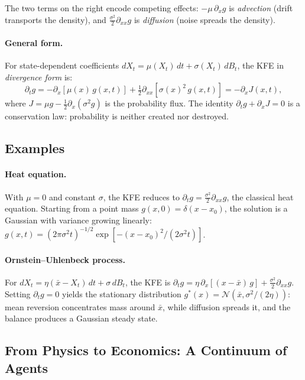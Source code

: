 \documentclass[11pt,a4paper]{report}
\begin{document}
The two terms on the right encode competing effects: $-\mu\,\partial_x g$ is \emph{advection} (drift transports the density), and $\tfrac{\sigma^2}{2}\partial_{xx}g$ is \emph{diffusion} (noise spreads the density).

\paragraph{General form.}  For state-dependent coefficients $dX_t = \mu(X_t)\,dt + \sigma(X_t)\,dB_t$, the KFE in \emph{divergence form} is:
\begin{equation}
\partial_t g = -\partial_x\!\left[\mu(x)\,g(x,t)\right] + \tfrac{1}{2}\partial_{xx}\!\left[\sigma(x)^2\,g(x,t)\right] = -\partial_x J(x,t),
\label{eq:kfe_general}
\end{equation}
where $J = \mu g - \tfrac{1}{2}\partial_x(\sigma^2 g)$ is the probability flux.  The identity $\partial_t g + \partial_x J = 0$ is a conservation law: probability is neither created nor destroyed.

\subsection{Examples}

\paragraph{Heat equation.}  With $\mu = 0$ and constant $\sigma$, the KFE reduces to $\partial_t g = \tfrac{\sigma^2}{2}\partial_{xx}g$, the classical heat equation.  Starting from a point mass $g(x,0) = \delta(x-x_0)$, the solution is a Gaussian with variance growing linearly: $g(x,t) = (2\pi\sigma^2 t)^{-1/2}\exp[-(x-x_0)^2/(2\sigma^2 t)]$.

\paragraph{Ornstein--Uhlenbeck process.}  For $dX_t = \eta(\bar{x} - X_t)\,dt + \sigma\,dB_t$, the KFE is $\partial_t g = \eta\,\partial_x[(x - \bar{x})\,g] + \tfrac{\sigma^2}{2}\partial_{xx}g$.  Setting $\partial_t g = 0$ yields the stationary distribution $g^*(x) = \mathcal{N}(\bar{x}, \sigma^2/(2\eta))$: mean reversion concentrates mass around $\bar{x}$, while diffusion spreads it, and the balance produces a Gaussian steady state.

\subsection{From Physics to Economics: A Continuum of Agents}
\end{document}
